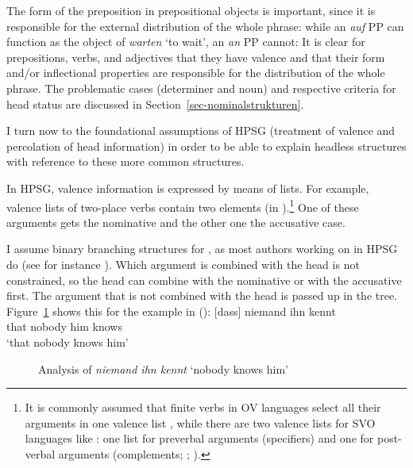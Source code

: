 \documentclass[output=paper
  ,nobabel
  ,draftmode
  ,uniformtopskip %
  ,colorlinks, citecolor=brown
]{langscibook}
\begin{document}
\largerpage[2]
\noindent
The form of the preposition in prepositional objects is important, since it is responsible for the
external distribution of the whole phrase: while an \emph{auf} PP can function as the object of
\emph{warten} `to wait', an \emph{an} PP cannot:
\eal
{}
\zl
It is clear for prepositions, verbs, and adjectives that they have valence and that their
form and/or inflectional properties are responsible for the distribution of the whole phrase. The problematic
cases (determiner and noun) and respective criteria for head status are discussed in Section~\ref{sec-nominalstrukturen}.

I turn now to the foundational assumptions of HPSG (treatment of valence and percolation of
head information) in order to be able to explain headless structures with reference to these more
common structures.

In HPSG, valence information is expressed by means of lists. For example, valence lists of two-place
verbs contain two elements (in ).\footnote{
  It is commonly assumed that finite verbs in OV languages select all their arguments in one valence
  list \parencites[--296]{Pollard90a-Eng}[Section~3.1.1]{Kiss95a}[]{Mueller2002b}, while there are two valence lists for SVO languages like : one list for preverbal
  arguments (specifiers) and one for post-verbal arguments (complements;
  \citealp*[Section~4.3]{SWB2003a}; \citealp[Section~4.3]{MuellerGermanic}).
}
One of these arguments gets the nominative and the other one the accusative case. 

I assume binary branching structures for , as most authors working on  in HPSG do (see for instance
\citealt{HN94a,Kiss95a,Meurers99a,Mueller99a,Kathol2000a,Holler-Feldhaus2001a}). Which argument is
combined with the head is not constrained, so the head can combine with the nominative or with the accusative
first. The argument that is not combined with the head is passed up in the
tree. Figure~\ref{abb-niemand-ihn-kennt} shows this for the example in ():
\ea
\gll {}[dass] niemand ihn kennt\\
     \spacebr{}that nobody him knows\\
\glt `that nobody knows him'
\z
\begin{figure}
\caption{Analysis of \emph{niemand ihn kennt} `nobody knows him'}\label{abb-niemand-ihn-kennt}
\end{figure}
\end{document}
